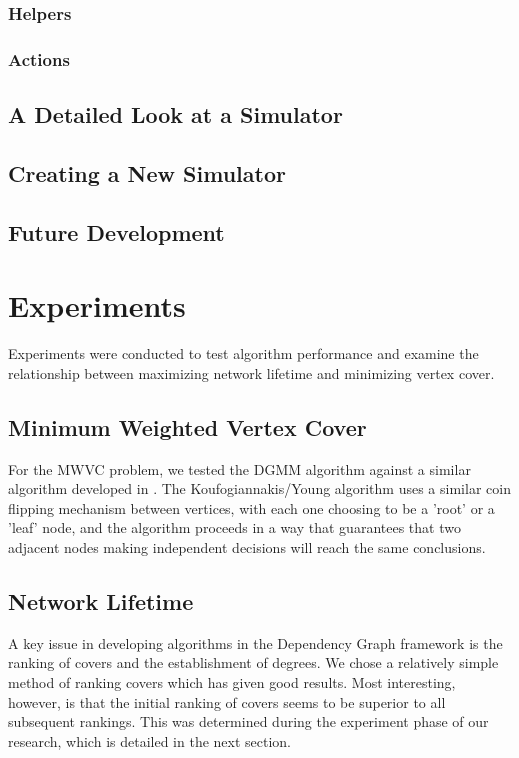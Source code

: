 \subsubsection{Helpers}
\subsubsection{Actions}
\subsection{A Detailed Look at a Simulator}
\label{sec:sim-detail}
\subsection{Creating a New Simulator}
\label{sec:sim-new}
\subsection{Future Development}
\label{sec:sim-future}

\section{Experiments}
\label{sec:experiments}
Experiments were conducted to test algorithm performance and examine the relationship between maximizing network lifetime and minimizing vertex cover.
\subsection{Minimum Weighted Vertex Cover}
\label{sub:mwvc-exp}

For the MWVC problem, we tested the DGMM algorithm against a similar algorithm developed in \cite{1582746}. The Koufogiannakis/Young algorithm uses a similar coin flipping mechanism between vertices, with each one choosing to be a 'root' or a 'leaf' node, and the algorithm proceeds in a way that guarantees that two adjacent nodes making independent decisions will reach the same conclusions. 

\subsection{Network Lifetime}

A key issue in developing algorithms in the Dependency Graph framework is the ranking of covers and the establishment of degrees. We chose a relatively simple method of ranking covers which has given good results. Most interesting, however, is that the initial ranking of covers seems to be superior to all subsequent rankings. This was determined during the experiment phase of our research, which is detailed in the next section.

